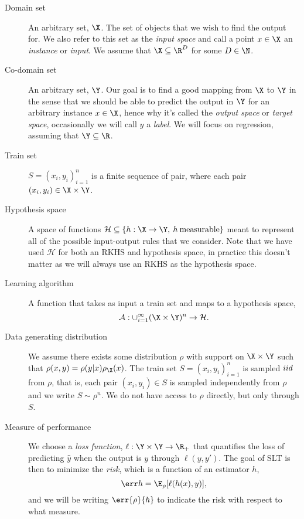 \begin{description}
\item[{Domain set}] An arbitrary set, \(\X\). The set of objects that we wish to
find the output for. We also refer to this set as the \emph{input space} and
call a point \(x \in \X\) an \emph{instance} or \emph{input}. We assume that
\(\X \subseteq \R^{D}\) for some \(D \in \N\).
\item[{Co-domain set}] An arbitrary set, \(\Y\). Our goal is to find a good
mapping from \(\X\) to \(\Y\) in the sense that we should be able to predict the
output in \(\Y\) for an arbitrary instance \(x \in \X\), hence why it's called
the \emph{output space} or \emph{target space}, occasionally we will call \(y\)
a \emph{label}. We will focus on regression, assuming that \(\Y \subseteq \R\).
\item[{Train set}] \(S = (x_{i}, y_{i})_{i=1}^{n}\) is a finite sequence of
pair, where each pair \((x_{i}, y_{i}) \in \X \times \Y\).
\item[{Hypothesis space}] A space of functions \(\mathcal{H} \subseteq \{h : \X
\to \Y, \: h \: \mathrm{measurable}\}\) meant to represent all of the possible
input-output rules that we consider. Note that we have used \(\mathcal{H}\) for
both an RKHS and hypothesis space, in practice this doesn't matter as we will
always use an RKHS as the hypothesis space.
\item[{Learning algorithm}] A function that takes as input a train set and maps
  to a hypothesis space,
  \begin{equation}
    \label{eq:sl-algorithm}
    \algo : \cup_{i=1}^{\infty} (\X \times \Y)^{n} \to \mathcal{H}.
  \end{equation}
\item[{Data generating distribution}] We assume there exists some distribution
\(\rho\) with support on \(\X \times \Y\) such that \(\rho(x, y) = \rho(y |
x)\rho_{\X}(x)\). The train set \(S = (x_{i}, y_{i})_{i=1}^{n}\) is sampled
\(iid\) from \(\rho\), that is, each pair \((x_{i}, y_{i}) \in S\) is sampled
independently from \(\rho\) and we write \(S \sim \rho^{n}\). We do not have
access to \(\rho\) directly, but only through \(S\).
\item[{Measure of performance}] We choose a \emph{loss function}, \(\ell : \Y
\times \Y \to \R_{+}\) that quantifies the loss of predicting \(\hat{y}\) when
the output is \(y\) through \(\ell(y, y')\). The goal of SLT is then to minimize
the \emph{risk}, which is a function of an estimator \(h\),
\begin{equation}
\label{eq:def-risk} \risk{}{h} = \E_{\rho}[\ell(h(x), y)],
\end{equation} and we will be writing \(\err{\rho}{h}\) to indicate the risk
with respect to what measure.
\end{description}

